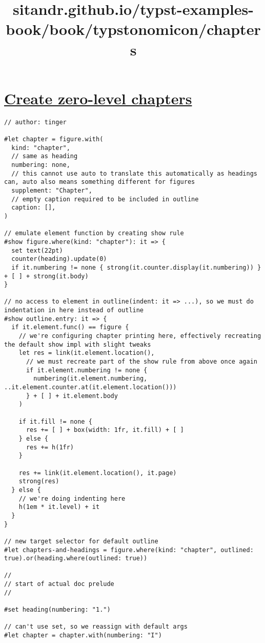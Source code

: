 \title{sitandr.github.io/typst-examples-book/book/typstonomicon/chapters}

\section{\texorpdfstring{\hyperref[create-zero-level-chapters]{Create
zero-level
chapters}}{Create zero-level chapters}}\label{create-zero-level-chapters}

\begin{verbatim}
// author: tinger

#let chapter = figure.with(
  kind: "chapter",
  // same as heading
  numbering: none,
  // this cannot use auto to translate this automatically as headings can, auto also means something different for figures
  supplement: "Chapter",
  // empty caption required to be included in outline
  caption: [],
)

// emulate element function by creating show rule
#show figure.where(kind: "chapter"): it => {
  set text(22pt)
  counter(heading).update(0)
  if it.numbering != none { strong(it.counter.display(it.numbering)) } + [ ] + strong(it.body)
}

// no access to element in outline(indent: it => ...), so we must do indentation in here instead of outline
#show outline.entry: it => {
  if it.element.func() == figure {
    // we're configuring chapter printing here, effectively recreating the default show impl with slight tweaks
    let res = link(it.element.location(), 
      // we must recreate part of the show rule from above once again
      if it.element.numbering != none {
        numbering(it.element.numbering, ..it.element.counter.at(it.element.location()))
      } + [ ] + it.element.body
    )

    if it.fill != none {
      res += [ ] + box(width: 1fr, it.fill) + [ ] 
    } else {
      res += h(1fr)
    }

    res += link(it.element.location(), it.page)
    strong(res)
  } else {
    // we're doing indenting here
    h(1em * it.level) + it
  }
}

// new target selector for default outline
#let chapters-and-headings = figure.where(kind: "chapter", outlined: true).or(heading.where(outlined: true))

//
// start of actual doc prelude
//

#set heading(numbering: "1.")

// can't use set, so we reassign with default args
#let chapter = chapter.with(numbering: "I")


\end{verbatim}
